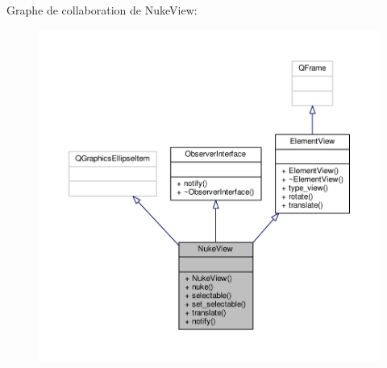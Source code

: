Graphe de collaboration de Nuke\+View\+:\nopagebreak
\begin{figure}[H]
\begin{center}
\leavevmode
\includegraphics[width=350pt]{db/d47/classNukeView__coll__graph}
\end{center}
\end{figure}
